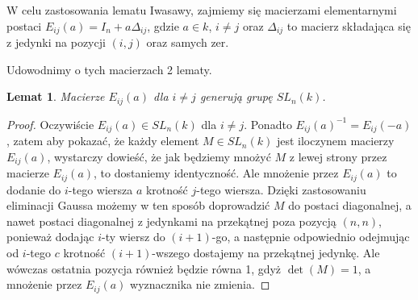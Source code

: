 \documentclass[licencjacka]{pracamgr}
\newtheorem{lemma}{Lemat}[section]
\begin{document}


W celu zastosowania lematu Iwasawy, zajmiemy się macierzami elementarnymi postaci
$E_{i j} (a) = I_n + a \Delta_{i j}$, gdzie $a \in k$, $i \ne j$ oraz 
$\Delta_{i j}$ to macierz składająca się z jedynki na pozycji $(i, j)$ oraz samych zer.

Udowodnimy o tych macierzach 2 lematy.

\begin{lemma}\label{lemma_Eij_generates_SL}
  Macierze $E_{i j}(a)$ dla $i \ne j$ generują grupę $SL_n(k)$.
\end{lemma}
\begin{proof}
  Oczywiście $E_{i j}(a) \in SL_n(k)$ dla $i \ne j$. 
  Ponadto $E_{i j}(a)^{-1} = E_{i j}(-a)$, zatem aby pokazać, że każdy element $M \in SL_n(k)$ jest iloczynem macierzy $E_{i j}(a)$,
  wystarczy dowieść, że jak będziemy mnożyć $M$ z lewej strony przez macierze $E_{i j}(a)$, to dostaniemy identyczność.
  Ale mnożenie przez $E_{i j}(a)$ to dodanie do $i$-tego wiersza $a$ krotność $j$-tego wiersza.
  Dzięki zastosowaniu eliminacji Gaussa możemy w ten sposób doprowadzić $M$ do postaci diagonalnej,
  a nawet postaci diagonalnej z jedynkami na przekątnej poza pozycją $(n, n)$, ponieważ dodając $i$-ty wiersz do $(i+1)$-go, a następnie odpowiednio
  odejmując od $i$-tego $c$ krotność $(i+1)$-wszego dostajemy na przekątnej jedynkę. Ale wówczas ostatnia pozycja również będzie równa 1, 
  gdyż $\det(M) = 1$, a mnożenie przez $E_{i j}(a)$ wyznacznika nie zmienia.
\end{proof}
\end{document}
